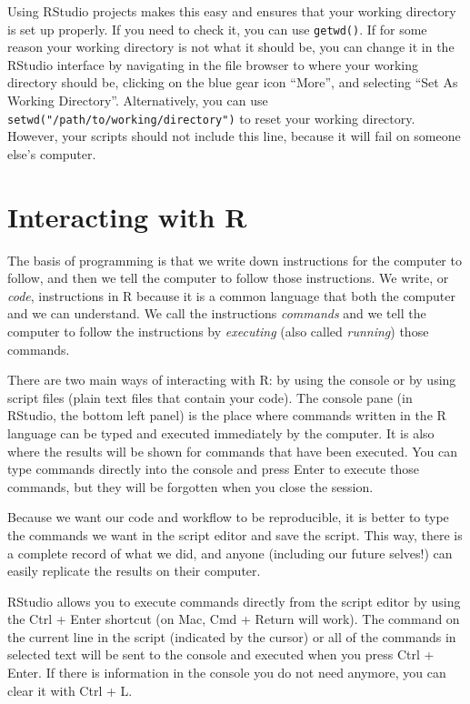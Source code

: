 \documentclass[]{book}
\begin{document}
Using RStudio projects makes this easy and ensures that your working
directory is set up properly. If you need to check it, you can use
\texttt{getwd()}. If for some reason your working directory is not what
it should be, you can change it in the RStudio interface by navigating
in the file browser to where your working directory should be, clicking
on the blue gear icon ``More'', and selecting ``Set As Working
Directory''. Alternatively, you can use
\texttt{setwd("/path/to/working/directory")} to reset your working
directory. However, your scripts should not include this line, because
it will fail on someone else's computer.

\section{Interacting with R}\label{interacting-with-r}

The basis of programming is that we write down instructions for the
computer to follow, and then we tell the computer to follow those
instructions. We write, or \emph{code}, instructions in R because it is
a common language that both the computer and we can understand. We call
the instructions \emph{commands} and we tell the computer to follow the
instructions by \emph{executing} (also called \emph{running}) those
commands.

There are two main ways of interacting with R: by using the console or
by using script files (plain text files that contain your code). The
console pane (in RStudio, the bottom left panel) is the place where
commands written in the R language can be typed and executed immediately
by the computer. It is also where the results will be shown for commands
that have been executed. You can type commands directly into the console
and press Enter to execute those commands, but they will be forgotten
when you close the session.

Because we want our code and workflow to be reproducible, it is better
to type the commands we want in the script editor and save the script.
This way, there is a complete record of what we did, and anyone
(including our future selves!) can easily replicate the results on their
computer.

RStudio allows you to execute commands directly from the script editor
by using the Ctrl + Enter shortcut (on Mac, Cmd + Return will work). The
command on the current line in the script (indicated by the cursor) or
all of the commands in selected text will be sent to the console and
executed when you press Ctrl + Enter. If there is information in the
console you do not need anymore, you can clear it with Ctrl + L.
\end{document}
